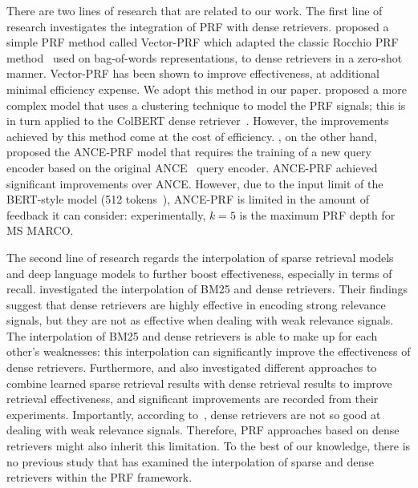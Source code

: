 There are two lines of research that are related to our work. The first line of research  investigates the integration of PRF with dense retrievers. \citet{li2021pseudo} proposed a simple PRF method called Vector-PRF which adapted the classic Rocchio PRF method~\cite{rocchio1971rocchio} used on bag-of-words representations, to dense retrievers in a zero-shot manner. Vector-PRF has been shown to improve effectiveness, at  additional minimal efficiency expense. We adopt this method in our paper. \citet{wang2021pseudo} proposed a more complex model that uses a clustering technique to model the PRF signals; this is in turn applied to the ColBERT dense retriever~\cite{khattab2020colbert}. However, the improvements achieved by this method come at the cost of efficiency. \citet{yu2021improving}, on the other hand, proposed the ANCE-PRF model that requires the training of a new query encoder based on the original ANCE~\cite{xiong2020approximate} query encoder. ANCE-PRF achieved significant improvements over ANCE. However, due to the input limit of the BERT-style model (512 tokens~\cite{devlin2018bert}), ANCE-PRF is limited in the amount of feedback it can consider: experimentally, $k=5$ is the maximum PRF depth for MS MARCO. %

The second line of research regards the interpolation of sparse retrieval models and deep language models to further boost effectiveness, especially in terms of recall. \citet{wang2021bert} investigated the interpolation of BM25 and dense retrievers. Their findings suggest that dense retrievers are highly effective in encoding strong relevance signals, but they are not as effective when dealing with weak relevance signals. The interpolation of BM25 and dense retrievers is able to make up for each other's weaknesses: this interpolation can significantly improve the effectiveness of dense retrievers. Furthermore, \citet{lin2021batch,lin2021few} and \citet{arabzadeh2021predicting} also investigated different approaches to combine learned sparse retrieval results with dense retrieval results to improve retrieval effectiveness, and significant improvements are recorded from their experiments.
Importantly, according to~\citet{wang2021bert}, dense retrievers are not so good at dealing with weak relevance signals. Therefore, PRF approaches based on dense retrievers might also inherit this limitation. To the best of our knowledge, there is no previous study that has examined the interpolation of sparse and dense retrievers within the PRF framework.

